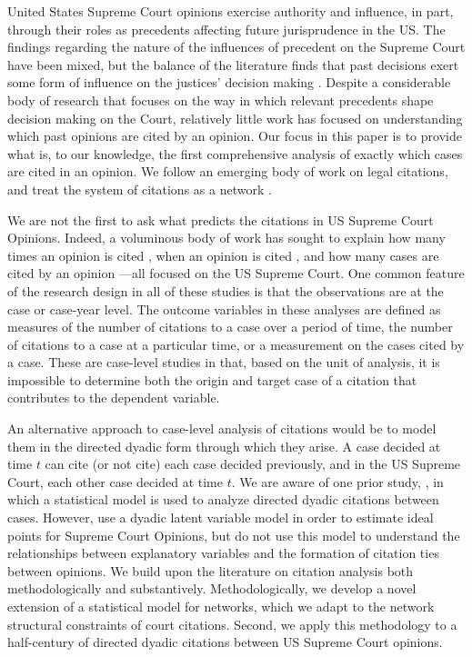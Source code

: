 \documentclass[headsepline=true, abstracton]{scrartcl}
\begin{document}
 
United States Supreme Court opinions exercise authority and influence, in part, through their roles as precedents affecting future jurisprudence in the US. The findings regarding the nature of the influences of precedent on the Supreme Court have been mixed, but the balance of the literature finds that past decisions exert some form of influence on the justices' decision making \citep{knight1996norm,gillman2001s,richards2002jurisprudential,hansford2006politics,bailey2008does,bailey2011constrained}. Despite a considerable body of research that focuses on the way in which relevant precedents shape decision making on the Court, relatively little work has focused on understanding which past opinions are cited by an opinion. Our focus in this paper is to provide what is, to our knowledge, the first comprehensive analysis of exactly which cases are cited in an opinion. We follow an emerging body of work on legal citations, and treat the system of citations as a network \citep[e.g., ][]{harris1982structural,caldeira1988legal,fowler2007network, fowler2008authority,bommarito2009law,lupu2012precedent,pelc2014politics}. 

We are not the first to ask what predicts the citations in US Supreme Court Opinions. Indeed, a voluminous body of work has sought to explain how many times an opinion is cited \citep[e.g.,][]{cross2010determinants,benjamin2012standing}, when an opinion is cited \citep[e.g.,][]{black2013citation,spriggs2001explaining}, and how many cases are cited by an opinion \citep[e.g.,][]{lupu2013strategic}---all focused on the US Supreme Court. One common feature of the research design in all of these studies is that the observations are at the case or case-year level. The outcome variables in these analyses are defined as measures of the number of citations to a case over a period of time, the number of citations to a case at a particular time, or a measurement on the cases cited by a case. These are case-level studies in that, based on the unit of analysis, it is impossible to determine both the origin and target case of a citation that contributes to the dependent variable.

An alternative approach to case-level analysis of citations would be to model them in the directed dyadic form through which they arise. A case decided at time $t$ can cite (or not cite) each case decided previously, and in the US Supreme Court, each other case decided at time $t$. We are aware of one prior study, \citet{clark2010locating}, in which a statistical model is used to analyze directed dyadic citations between cases. However, \citet{clark2010locating} use a dyadic latent variable model in order to estimate ideal points for Supreme Court Opinions, but do not use this model to understand the relationships between explanatory variables and the formation of citation ties between opinions. We build upon the literature on citation analysis both methodologically and substantively. Methodologically, we develop a novel extension of a statistical model for networks, which we adapt to the network structural constraints of court citations. Second, we apply this methodology to a half-century of directed dyadic citations between US Supreme Court opinions.
\end{document}
